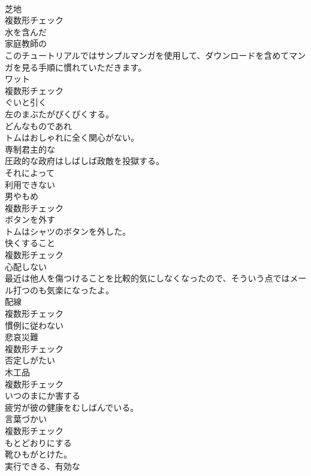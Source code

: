 \documentclass[8pt]{extreport}
\begin{document}
\begin{CJK}{UTF8}{min}
\\	[名詞]	芝地	
\\	複数形チェック
\\	[形容詞]	水を含んだ	
\\	[形容詞]	家庭教師の	
\\	このチュートリアルではサンプルマンガを使用して、ダウンロードを含めてマンガを見る手順に慣れていただきます。	
\\	[名詞]	ワット	
\\	複数形チェック
\\	[動詞]	ぐいと引く	
\\	左のまぶたがぴくぴくする。	
\\	[形容詞]	どんなものであれ	
\\	トムはおしゃれに全く関心がない。	
\\	[形容詞]	専制君主的な	
\\	圧政的な政府はしばしば政敵を投獄する。	
\\	[副詞]	それによって	
\\	[形容詞]	利用できない	
\\	[名詞]	男やもめ	
\\	複数形チェック
\\	[動詞]	ボタンを外す	
\\	トムはシャツのボタンを外した。	
\\	[名詞]	快くすること	
\\	複数形チェック
\\	[形容詞]	心配しない	
\\	最近は他人を傷つけることを比較的気にしなくなったので、そういう点ではメール打つのも気楽になったよ。	
\\	[名詞]	配線	
\\	複数形チェック
\\	[形容詞]	慣例に従わない	
\\	[名詞]	悲哀災難	
\\	複数形チェック
\\	[形容詞]	否定しがたい	
\\	[名詞]	木工品	
\\	複数形チェック
\\	[動詞]	いつのまにか害する	
\\	疲労が彼の健康をむしばんでいる。	
\\	[名詞]	言葉づかい	
\\	複数形チェック
\\	[形容詞]	もとどおりにする	
\\	靴ひもがとけた。	
\\	[形容詞]	実行できる、有効な	

\end{CJK}
\end{document}

